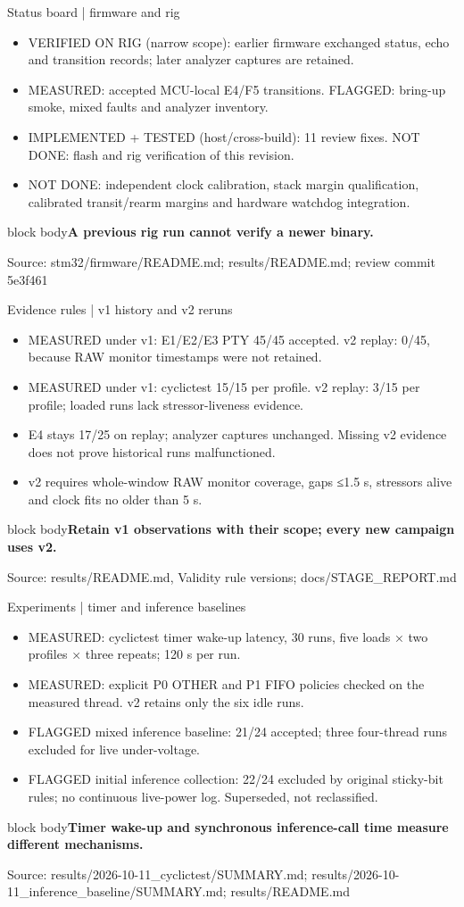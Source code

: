 \documentclass[aspectratio=169,12pt,t]{beamer}
\newcommand{\src}[1]{\par\vfill{\small\color{muted}Source: #1}}
\newcommand{\takeaway}[1]{\par\medskip\begin{beamercolorbox}[sep=2mm,wd=\linewidth]{block body}\color{navy}\textbf{#1}\end{beamercolorbox}}
\begin{document}
\begin{frame}{Status board | firmware and rig}
\begin{itemize}
\item VERIFIED ON RIG (narrow scope): earlier firmware exchanged status, echo and transition records; later analyzer captures are retained.
\item MEASURED: accepted MCU-local E4/F5 transitions. FLAGGED: bring-up smoke, mixed faults and analyzer inventory.
\item IMPLEMENTED + TESTED (host/cross-build): 11 review fixes. NOT DONE: flash and rig verification of this revision.
\item NOT DONE: independent clock calibration, stack margin qualification, calibrated transit/rearm margins and hardware watchdog integration.
\end{itemize}
\takeaway{A previous rig run cannot verify a newer binary.}\src{stm32/firmware/README.md; results/README.md; review commit 5e3f461}
\end{frame}
\begin{frame}{Evidence rules | v1 history and v2 reruns}
\begin{itemize}
\item MEASURED under v1: E1/E2/E3 PTY 45/45 accepted. v2 replay: 0/45, because RAW monitor timestamps were not retained.
\item MEASURED under v1: cyclictest 15/15 per profile. v2 replay: 3/15 per profile; loaded runs lack stressor-liveness evidence.
\item E4 stays 17/25 on replay; analyzer captures unchanged. Missing v2 evidence does not prove historical runs malfunctioned.
\item v2 requires whole-window RAW monitor coverage, gaps ≤1.5 s, stressors alive and clock fits no older than 5 s.
\end{itemize}
\takeaway{Retain v1 observations with their scope; every new campaign uses v2.}\src{results/README.md, Validity rule versions; docs/STAGE\_REPORT.md}
\end{frame}
\begin{frame}{Experiments | timer and inference baselines}
\begin{itemize}
\item MEASURED: cyclictest timer wake-up latency, 30 runs, five loads × two profiles × three repeats; 120 s per run.
\item MEASURED: explicit P0 OTHER and P1 FIFO policies checked on the measured thread. v2 retains only the six idle runs.
\item FLAGGED mixed inference baseline: 21/24 accepted; three four-thread runs excluded for live under-voltage.
\item FLAGGED initial inference collection: 22/24 excluded by original sticky-bit rules; no continuous live-power log. Superseded, not reclassified.
\end{itemize}
\takeaway{Timer wake-up and synchronous inference-call time measure different mechanisms.}\src{results/2026-10-11\_cyclictest/SUMMARY.md; results/2026-10-11\_inference\_baseline/SUMMARY.md; results/README.md}
\end{frame}
\end{document}
